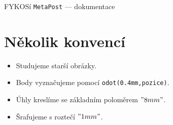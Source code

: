 \documentclass[a4paper,10pt]{article}
\begin{document}
{\LARGE\centering FYKOSí {\tt MetaPost} --- dokumentace\\}\vspace{5mm}
\setcounter{section}{-1}
\section{Několik konvencí}
\begin{itemize}
\item Studujeme starší obrázky.
\item Body vyznačujeme pomocí \verb+odot(0.4mm,pozice)+.
\item Úhly kreslíme se základním poloměrem $"8 mm"$.
\item Šrafujeme s roztečí $"1 mm"$.
\end{itemize}

\end{document}
